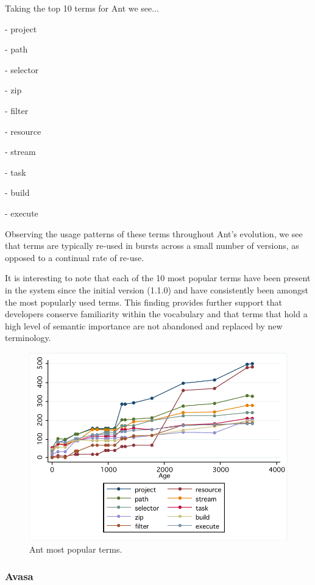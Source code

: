 Taking the top 10 terms for Ant we see...

\crumbs
{
	- project
	
	- path
	
	- selector
	
	- zip
	
	- filter
	
	- resource
	
	- stream
	
	- task
	
	- build
	
	- execute
}

Observing the usage patterns of these terms throughout Ant's evolution, we see that terms are typically re-used in bursts across a small number of versions, as opposed to a continual rate of re-use.

It is interesting to note that each of the 10 most popular terms have been present in the system since the initial version (1.1.0) and have consistently been amongst the most popularly used terms. This finding provides further support that developers conserve familiarity within the vocabulary and that terms that hold a high level of semantic importance are not abandoned and replaced by new terminology.

\begin{figure}[t]
\centering
\includegraphics[width=\textwidth]{Figures/Vocab-AntPopular.pdf}
\caption{Ant most popular terms.}
\label{fig:vocab-popular-terms-ant}
\end{figure}


\subsubsection{Avasa} %
\label{ssub:avasa}

